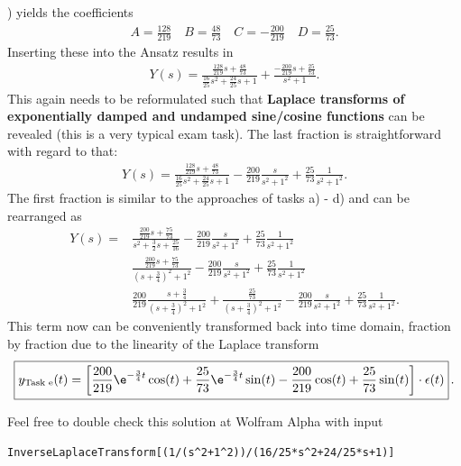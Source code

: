 ) yields the coefficients
\begin{align}
\label{eq:coeffABCDsinLaplace}
  A = \frac{128}{219}
  \quad B = \frac{48}{73}
  \quad C = -\frac{200}{219}
  \quad D = \frac{25}{73}.
\end{align}
%
%
Inserting these into the Ansatz results in
\begin{align}
Y(s) = \frac{\frac{128}{219} s +
\frac{48}{73}}{\frac{16}{25} s^2 +
\frac{24}{25} s + 1} +
\frac{-\frac{200}{219} s +
\frac{25}{73}}{s^2+1}.
\end{align}
This again needs to be reformulated such that \textbf{Laplace transforms of
exponentially damped and undamped sine/cosine functions}
can be revealed (this is a very typical exam task).
%
The last fraction is straightforward with regard to that:
\begin{align}
Y(s) = \frac{\frac{128}{219} s + \frac{48}{73}}{\frac{16}{25} s^2 + \frac{24}{25} s + 1}
-\frac{200}{219}\frac{s}{s^2+1^2}
+\frac{25}{73}\frac{1}{s^2+1^2}.
\end{align}
%
The first fraction is similar to the approaches of tasks a) - d) and can be
rearranged as
\begin{align}
Y(s) = &
\frac{\frac{200}{219} s + \frac{75}{73}}{s^2 + \frac{3}{2} s + \frac{25}{16}}
-\frac{200}{219}\frac{s}{s^2+1^2}
+\frac{25}{73}\frac{1}{s^2+1^2}\\
&
\frac{\frac{200}{219} s + \frac{75}{73}}{(s + \frac{3}{4})^2 + 1^2}
-\frac{200}{219}\frac{s}{s^2+1^2}
+\frac{25}{73}\frac{1}{s^2+1^2}\\
&
\frac{200}{219} \frac{s + \frac{3}{4}}{(s + \frac{3}{4})^2 + 1^2}+
\frac{\frac{25}{73}}{(s + \frac{3}{4})^2 + 1^2}
-\frac{200}{219}\frac{s}{s^2+1^2}
+\frac{25}{73}\frac{1}{s^2+1^2}.
\end{align}
This term now can be conveniently transformed back into time domain,
fraction by fraction due to the linearity of the Laplace transform
\begin{align}
\boxed{
  y_\text{Task e}(t) =
  \left[ \frac{200}{219} \e^{-\frac{3}{4} t} \cos(t) +
  \frac{25}{73} \e^{-\frac{3}{4} t} \sin(t) -
  \frac{200}{219} \cos(t) +
  \frac{25}{73} \sin(t) \right] \cdot \epsilon(t)}\,.
\end{align}

Feel free to double check this solution at Wolfram Alpha with input
\begin{verbatim}
InverseLaplaceTransform[(1/(s^2+1^2))/(16/25*s^2+24/25*s+1)]
\end{verbatim}



